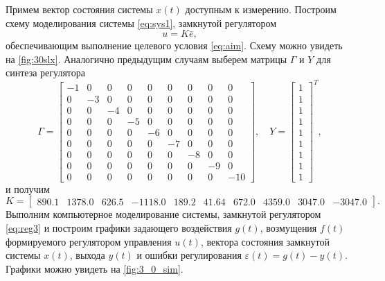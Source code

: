 Примем вектор состояния системы $x(t)$ доступным к измерению.
Построим схему моделирования системы \eqref{eq:sys1}, замкнутой регулятором
\begin{equation}
    \label{eq:reg3}
    u=K\bar e,
\end{equation}
обеспечивающим выполнение целевого условия \eqref{eq:aim}. Схему можно увидеть на 
\autoref{fig:30slx}.
Аналогично предыдущим случаям выберем матрицы $\Gamma$ и $Y$ для синтеза регулятора
\begin{equation*}
    \Gamma=\begin{bmatrix}
        -1 & 0 & 0 & 0 & 0 & 0 & 0 & 0 & 0\\
        0 & -3 & 0 & 0 & 0 & 0 & 0 & 0 & 0\\
        0 & 0 & -4 & 0 & 0 & 0 & 0 & 0 & 0\\
        0 & 0 & 0 & -5 & 0 & 0 & 0 & 0 & 0\\
        0 & 0 & 0 & 0 & -6 & 0 & 0 & 0 & 0\\
        0 & 0 & 0 & 0 & 0 & -7 & 0 & 0 & 0\\
        0 & 0 & 0 & 0 & 0 & 0 & -8 & 0 & 0\\
        0 & 0 & 0 & 0 & 0 & 0 & 0 & -9 & 0\\
        0 & 0 & 0 & 0 & 0 & 0 & 0 & 0 & -10
    \end{bmatrix},\quad
    Y=\begin{bmatrix}
        1 \\ 1 \\ 1 \\ 1 \\ 1 \\ 1 \\ 1 \\ 1 \\ 1
    \end{bmatrix}^T,
\end{equation*}
и получим 
\begin{equation*}
    K=\begin{bmatrix}
        890.1 & 1378.0 & 626.5 & -1118.0 & 189.2 & 41.64 & 672.0 & 4359.0 & 3047.0 & -3047.0
    \end{bmatrix}.
\end{equation*}
Выполним компьютерное моделирование системы, замкнутой регулятором
\eqref{eq:reg3} и построим графики задающего воздействия $g(t)$, возмущения $f(t)$ 
формируемого регулятором управления $u(t)$, вектора состояния замкнутой 
системы $x(t)$, выхода $y(t)$ и ошибки регулирования $\varepsilon(t) = g(t) - y(t)$.
Графики можно увидеть на \autoref{fig:3_0_sim}.

